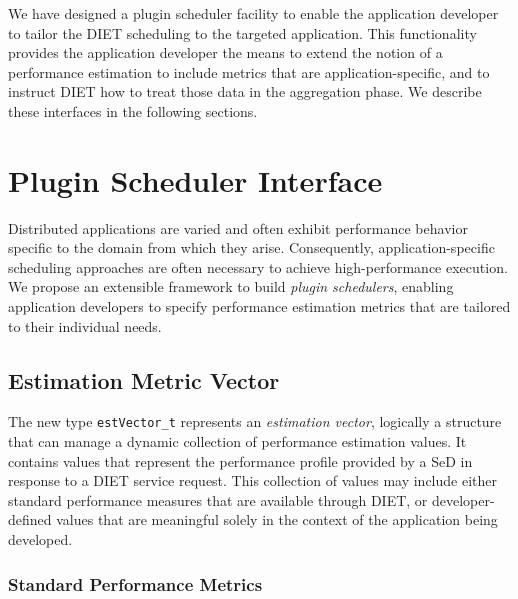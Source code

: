 We have designed a plugin scheduler facility to 
enable the application developer to tailor the DIET scheduling to the
targeted application.
This functionality provides
the application developer the means to extend the notion of a
performance estimation to include metrics that are
application-specific, and to instruct DIET how to treat those data in
the aggregation phase.
We describe these interfaces in the following sections.


\section{Plugin Scheduler Interface}

Distributed applications are varied and often exhibit performance
behavior specific to the domain from which they arise.  Consequently,
application-specific scheduling approaches are often necessary to
achieve high-performance execution.  We propose an extensible
framework to build
\emph{plugin schedulers}, enabling application developers to specify
performance estimation metrics that are tailored to their individual
needs.


\subsection{Estimation Metric Vector}\label{sect:estvector}

The new type \texttt{estVector\_t} represents an
\emph{estimation vector}, logically a structure that can manage a
dynamic collection of performance estimation values.  It contains
values that represent the performance profile provided by a
SeD in response to a DIET service request.  This collection of values
may include either standard performance measures that are available
through DIET, or developer-defined values that are meaningful solely in
the context of the application being developed.

\subsubsection{Standard Performance Metrics}

